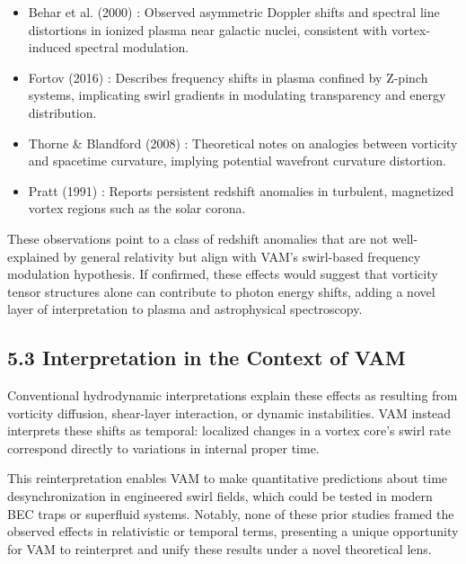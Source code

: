 \begin{itemize}

\item Behar et al. (2000) \cite{behar2000}: Observed asymmetric Doppler shifts and spectral line distortions in ionized plasma near galactic
nuclei, consistent with vortex-induced spectral modulation.

\item Fortov (2016) \cite{fortov2016}: Describes frequency shifts in plasma confined by Z-pinch systems, implicating swirl gradients in modulating
transparency and energy distribution.

\item Thorne \& Blandford (2008) \cite{thorne2008}: Theoretical notes on analogies between vorticity and spacetime curvature, implying potential
wavefront curvature distortion.



\item Pratt (1991) \cite{pratt1991}: Reports persistent redshift anomalies in turbulent, magnetized vortex regions such as the solar corona.




\end{itemize}

These observations point to a class of redshift anomalies that are not well-explained by general relativity but align with VAM's swirl-based frequency modulation hypothesis. If confirmed, these effects would suggest that vorticity tensor structures alone can contribute to photon energy shifts, adding a novel layer of interpretation to plasma and astrophysical spectroscopy.


\subsection*{5.3 Interpretation in the Context of VAM}

Conventional hydrodynamic interpretations explain these effects as resulting from vorticity diffusion, shear-layer interaction, or dynamic instabilities. VAM instead interprets these shifts as temporal: localized changes in a vortex core's swirl rate correspond directly to variations in internal proper time.


This reinterpretation enables VAM to make quantitative predictions about time desynchronization in engineered swirl fields, which could be tested in modern BEC traps or superfluid systems. Notably, none of these prior studies framed the observed effects in relativistic or temporal terms, presenting a unique opportunity for VAM to reinterpret and unify these results under a novel theoretical lens.


